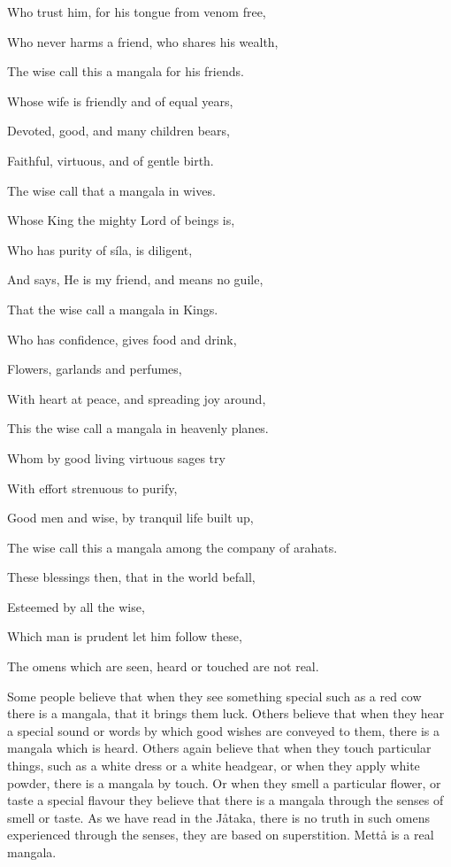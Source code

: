 \documentclass[12pt,twoside]{article}
\begin{document}
Who trust him, for his tongue from venom free, 

Who never harms a friend, who shares his wealth, 

The wise call this a mangala for his friends. 


\bigskip

Whose wife is friendly and of equal years, 

Devoted, good, and many children bears, 

Faithful, virtuous, and of gentle birth. 

The wise call that a mangala in wives. 


\bigskip

Whose King the mighty Lord of beings is, 

Who has purity of s\'ila, is diligent, 

And says, {\textasciigrave}{\textasciigrave}He is my
friend{\textquotesingle}{\textquotesingle}, and means no guile, 

That the wise call a mangala in Kings. 


\bigskip

Who has confidence, gives food and drink, 

Flowers, garlands and perfumes, 

With heart at peace, and spreading joy around, 

This the wise call a mangala in heavenly planes. 


\bigskip

Whom by good living virtuous sages try

With effort strenuous to purify,

Good men and wise, by tranquil life built up,

The wise call this a mangala among the company of arahats. 


\bigskip

These blessings then, that in the world befall,

Esteemed by all the wise,

Which man is prudent let him follow these,

The omens which are seen, heard or touched are not real. 


\bigskip

Some people believe that when they see something special such as a red
cow there is a mangala, that it brings them luck. Others believe that
when they hear a special sound or words by which good wishes are
conveyed to them, there is a mangala which is heard. Others again
believe that when they touch particular things, such as a white dress
or a white headgear, or when they apply white powder, there is a
mangala by touch. Or when they smell a particular flower, or taste a
special flavour they believe that there is a mangala through the senses
of smell or taste. As we have read in the J{\aa}taka, there is no truth
in such omens experienced through the senses, they are based on
superstition. Mett{\aa} is a real mangala. 
\end{document}
